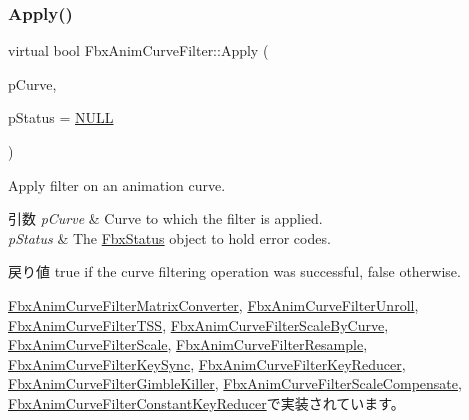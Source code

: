 \subsubsection{\texorpdfstring{Apply()}{Apply()}\hspace{0.1cm}{\footnotesize\ttfamily [5/5]}}
{\footnotesize\ttfamily virtual bool Fbx\+Anim\+Curve\+Filter\+::\+Apply (\begin{DoxyParamCaption}\item[{\hyperlink{class_fbx_anim_curve}{Fbx\+Anim\+Curve} \&}]{p\+Curve,  }\item[{\hyperlink{class_fbx_status}{Fbx\+Status} $\ast$}]{p\+Status = {\ttfamily \hyperlink{fbxarch_8h_a070d2ce7b6bb7e5c05602aa8c308d0c4}{N\+U\+LL}} }\end{DoxyParamCaption})\hspace{0.3cm}{\ttfamily [pure virtual]}}

Apply filter on an animation curve. 
\begin{DoxyParams}{引数}
{\em p\+Curve} & Curve to which the filter is applied. \\
\hline
{\em p\+Status} & The \hyperlink{class_fbx_status}{Fbx\+Status} object to hold error codes. \\
\hline
\end{DoxyParams}
\begin{DoxyReturn}{戻り値}
{\ttfamily true} if the curve filtering operation was successful, {\ttfamily false} otherwise. 
\end{DoxyReturn}


\hyperlink{class_fbx_anim_curve_filter_matrix_converter_a33ffa3eacf298e44aeaaec44db9bdd26}{Fbx\+Anim\+Curve\+Filter\+Matrix\+Converter}, \hyperlink{class_fbx_anim_curve_filter_unroll_a7c8ff0c5328b5d7ca85f0d187cd8f98c}{Fbx\+Anim\+Curve\+Filter\+Unroll}, \hyperlink{class_fbx_anim_curve_filter_t_s_s_a5ae3b50e72c3eb6846938a01b3559b21}{Fbx\+Anim\+Curve\+Filter\+T\+SS}, \hyperlink{class_fbx_anim_curve_filter_scale_by_curve_a3914c0e65233ce6f2177d5d7e65c15ea}{Fbx\+Anim\+Curve\+Filter\+Scale\+By\+Curve}, \hyperlink{class_fbx_anim_curve_filter_scale_a1d3234359a5766b4476e4a0522104d77}{Fbx\+Anim\+Curve\+Filter\+Scale}, \hyperlink{class_fbx_anim_curve_filter_resample_aa4edbed0ce74836a77fe4fd907c604a6}{Fbx\+Anim\+Curve\+Filter\+Resample}, \hyperlink{class_fbx_anim_curve_filter_key_sync_acc77ba686024c5f204e9e78e52dc15f5}{Fbx\+Anim\+Curve\+Filter\+Key\+Sync}, \hyperlink{class_fbx_anim_curve_filter_key_reducer_a8b2b0d1d3eaeb8d1333be55211a75b1a}{Fbx\+Anim\+Curve\+Filter\+Key\+Reducer}, \hyperlink{class_fbx_anim_curve_filter_gimble_killer_ac74aff21904a7cb323f2ed4bafae6fa6}{Fbx\+Anim\+Curve\+Filter\+Gimble\+Killer}, \hyperlink{class_fbx_anim_curve_filter_scale_compensate_ae1cb78bcd44d445bb5d8b9bd2aaa3142}{Fbx\+Anim\+Curve\+Filter\+Scale\+Compensate}, \hyperlink{class_fbx_anim_curve_filter_constant_key_reducer_a45c9f6f26dc37686d684e1a35ac6b4c0}{Fbx\+Anim\+Curve\+Filter\+Constant\+Key\+Reducer}で実装されています。

